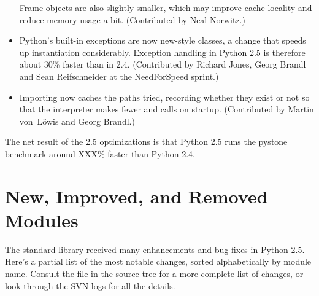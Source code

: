 \documentclass{howto}
\begin{document}
\begin{itemize}
Frame objects are also slightly smaller, which may improve cache locality
and reduce memory usage a bit.  (Contributed by Neal Norwitz.)

\item Python's built-in exceptions are now new-style classes, a change
that speeds up instantiation considerably.  Exception handling in
Python 2.5 is therefore about 30\% faster than in 2.4.
(Contributed by Richard Jones, Georg Brandl and Sean Reifschneider at
the NeedForSpeed sprint.)

\item Importing now caches the paths tried, recording whether 
they exist or not so that the interpreter makes fewer 
 and  calls on startup.
(Contributed by Martin von~L\"owis and Georg Brandl.)

\end{itemize}

The net result of the 2.5 optimizations is that Python 2.5 runs the
pystone benchmark around XXX\% faster than Python 2.4.


\section{New, Improved, and Removed Modules\label{modules}}

The standard library received many enhancements and bug fixes in
Python 2.5.  Here's a partial list of the most notable changes, sorted
alphabetically by module name. Consult the  file in
the source tree for a more complete list of changes, or look through
the SVN logs for all the details.
\end{document}
